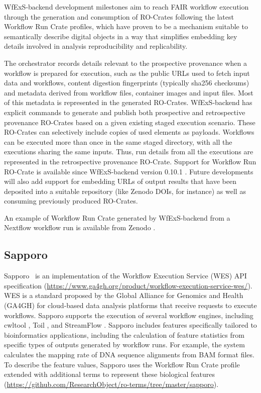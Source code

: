 \documentclass[10pt,letterpaper]{article}
\begin{document}
WfExS-backend development milestones aim to reach FAIR workflow execution through the generation and consumption of RO-Crates following the latest Workflow Run Crate profiles, which have proven to be a mechanism suitable to semantically describe digital objects in a way that simplifies embedding key details involved in analysis reproducibility and replicability.

The orchestrator records details relevant to the prospective provenance when a workflow is prepared for execution, such as the public URLs used to fetch input data and workflows, content digestion fingerprints (typically sha256 checksums) and metadata derived from workflow files, container images and input files.
Most of this metadata is represented in the generated RO-Crates. WfExS-backend has explicit commands to generate and publish both prospective and retrospective provenance RO-Crates based on a given existing staged execution scenario.
These RO-Crates can selectively include copies of used elements as payloads.
Workflows can be executed more than once in the same staged directory, with all the executions sharing the same inputs.
Thus, run details from all the executions are represented in the retrospective provenance RO-Crate. Support for Workflow Run RO-Crate is available since WfExS-backend version 0.10.1 \cite{Fernández 2023a}.
Future developments will also add support for embedding URLs of output results that have been deposited into a suitable repository (like Zenodo DOIs, for instance) as well as consuming previously produced RO-Crates.

An example of Workflow Run Crate generated by WfExS-backend from a Nextflow workflow run \cite{Bouyssié 2023} is available from Zenodo \cite{Fernández 2023b}.


\subsection{Sapporo}\label{sapporo}

Sapporo~\cite{Suetake 2022a} is an implementation of the Workflow Execution Service (WES) API specification (\url{https://www.ga4gh.org/product/workflow-execution-service-wes/}).
WES is a standard proposed by the Global Alliance for Genomics and Health (GA4GH) for cloud-based data analysis platforms that receive requests to execute workflows.
Sapporo supports the execution of several workflow engines, including cwltool \cite{Amstutz 2023}, Toil \cite{Vivian 2017}, and StreamFlow \cite{Colonnelli 2021}.
Sapporo includes features specifically tailored to bioinformatics applications, including the calculation of feature statistics from specific types of outputs generated by workflow runs.
For example, the system calculates the mapping rate of DNA sequence alignments from BAM format files.
To describe the feature values, Sapporo uses the Workflow Run Crate profile extended with additional terms to represent these biological features (\url{https://github.com/ResearchObject/ro-terms/tree/master/sapporo}).
\end{document}
